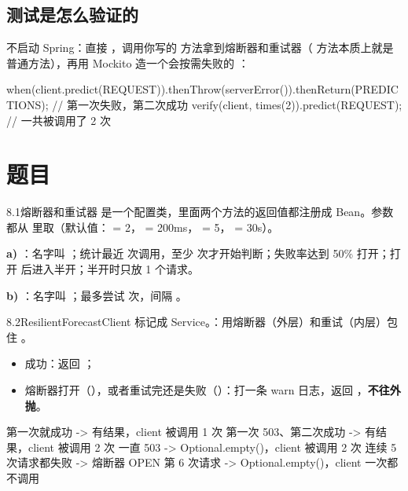 \subsection{测试是怎么验证的}

 不启动 Spring：直接 ，调用你写的  方法拿到熔断器和重试器（ 方法本质上就是普通方法），再用 Mockito 造一个会按需失败的 ：

\begin{java}
when(client.predict(REQUEST)).thenThrow(serverError()).thenReturn(PREDICTIONS);  // 第一次失败，第二次成功
verify(client, times(2)).predict(REQUEST);                                       // 一共被调用了 2 次
\end{java}

\section{题目}

\begin{task}{8.1\quad 熔断器和重试器}
 是一个配置类，里面两个方法的返回值都注册成 Bean。参数都从  里取（默认值： = 2， = 200ms， = 5， = 30s）。

\textbf{a) }：名字叫 ；统计最近  次调用，至少  次才开始判断；失败率达到 50\% 打开；打开  后进入半开；半开时只放 1 个请求。

\textbf{b) }：名字叫 ；最多尝试  次，间隔 。
\end{task}

\begin{task}{8.2\quad ResilientForecastClient}
标记成 Service。：用熔断器（外层）和重试（内层）包住 。

\begin{itemize}
  \item 成功：返回 ；
  \item 熔断器打开（），或者重试完还是失败（）：打一条 warn 日志，返回 ，\textbf{不往外抛}。
\end{itemize}

\begin{example}
\begin{plaincode}
第一次就成功          ->  有结果，client 被调用 1 次
第一次 503、第二次成功  ->  有结果，client 被调用 2 次
一直 503              ->  Optional.empty()，client 被调用 2 次
连续 5 次请求都失败    ->  熔断器 OPEN
第 6 次请求           ->  Optional.empty()，client 一次都不调用
\end{plaincode}
\end{example}
\end{task}

